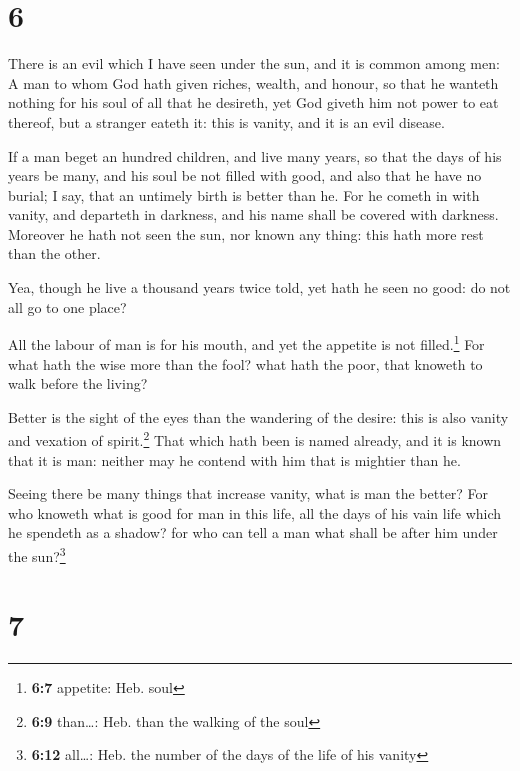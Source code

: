 \hypertarget{section-5}{%
\section{6}\label{section-5}}

 There is an evil which I have seen under the sun, and it
is common among men:  A man to whom God hath given riches,
wealth, and honour, so that he wanteth nothing for his soul of all that
he desireth, yet God giveth him not power to eat thereof, but a stranger
eateth it: this is vanity, and it is an evil disease.

 If a man beget an hundred children, and live many years,
so that the days of his years be many, and his soul be not filled with
good, and also that he have no burial; I say, that an untimely birth is
better than he.  For he cometh in with vanity, and
departeth in darkness, and his name shall be covered with darkness.
 Moreover he hath not seen the sun, nor known any thing:
this hath more rest than the other.

 Yea, though he live a thousand years twice told, yet hath
he seen no good: do not all go to one place?

 All the labour of man is for his mouth, and yet the
appetite is not filled.\footnote{\textbf{6:7} appetite: Heb. soul}
 For what hath the wise more than the fool? what hath the
poor, that knoweth to walk before the living?

 Better is the sight of the eyes than the wandering of the
desire: this is also vanity and vexation of spirit.\footnote{\textbf{6:9}
  than\ldots: Heb. than the walking of the soul}  That
which hath been is named already, and it is known that it is man:
neither may he contend with him that is mightier than he.

 Seeing there be many things that increase vanity, what
is man the better?  For who knoweth what is good for man
in this life, all the days of his vain life which he spendeth as a
shadow? for who can tell a man what shall be after him under the
sun?\footnote{\textbf{6:12} all\ldots: Heb. the number of the days of
  the life of his vanity}

\hypertarget{section-6}{%
\section{7}\label{section-6}}

